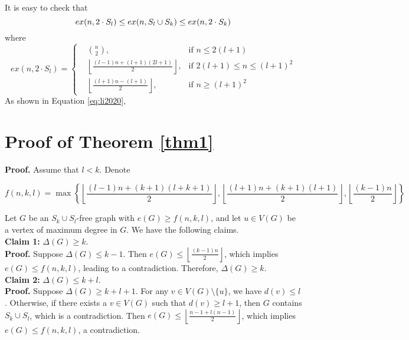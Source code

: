 \documentclass[12pt]{elsarticle}
\begin{document}
It is easy to check that 
\begin{equation}
ex(n, 2 \cdot S_{l}) \leq ex(n, S_{l}\cup S_{k}) \leq ex(n, 2 \cdot S_{k}) \notag
\end{equation}
where
\begin{equation}
ex(n, 2 \cdot S_{l}) = \left\{
\begin{aligned}
    &\binom{n}{2}, & \text{if } n \le 2(l+1) \\ 
    &\left\lfloor \frac{(l-1)n+(l+1)(2l+1)}{2} \right\rfloor, & \text{if }  2(l+1) \le n \le (l+1)^2 \\
    &\left\lfloor \frac{(l+1)n-(l+1)}{2} \right\rfloor, & \text{if } n \ge (l+1)^2 
\end{aligned}
\right.
\label{eq:li2020}
\end{equation}
As shown in Equation \ref{eq:li2020}, \cite{li2020}







\section{Proof of Theorem \ref{thm1}}
\textbf{Proof.}
Assume that \( l < k \).
Denote 
\begin{footnotesize}
$$f(n,k,l)=\max\left\{\left\lfloor \frac{(l-1)n+(k+1)(l+k+1)}{2} \right\rfloor, \left\lfloor \frac{(l+1)n+(k+1)(l+1)}{2} \right\rfloor, \left\lfloor \frac{(k-1)n}{2} \right\rfloor\right\}
$$
\end{footnotesize}
Let $G$ be an $S_k \cup S_l$-free graph with $e(G)\ge f(n,k,l)$, and let $u \in V(G)$ be a vertex of maximum degree in $G$. We have the following claims. \\

\textbf{Claim 1:} $\Delta(G) \ge k$.  \\

\textbf{Proof.} Suppose $\Delta(G) \le k-1$. Then $e(G) \le \left\lfloor \frac{(k-1)n}{2} \right\rfloor$, which implies $e(G) \le f(n, k, l)$, leading to a contradiction. Therefore, $\Delta(G) \ge k$.   \\

\textbf{Claim 2:} $\Delta(G) \le k + l$. \\

\textbf{Proof.} Suppose $\Delta(G) \ge k + l + 1$. For any $v \in V(G) \setminus \{u\}$, we have $d(v) \le l$. Otherwise, if there exists a $v \in V(G)$ such that $d(v) \ge l + 1$, then $G$ contains $S_k \cup S_l$, which is a contradiction.  Then $e(G) \le \left\lfloor \frac{n-1+l(n-1)}{2} \right\rfloor$, which implies $e(G) \le f(n, k, l)$, a contradiction.  \\
\end{document}
